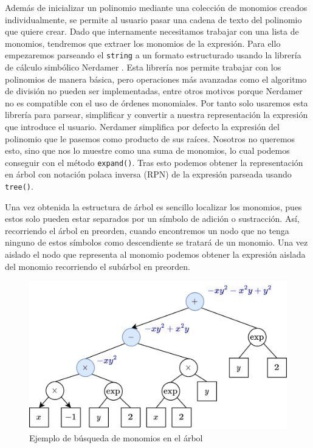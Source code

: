 Además de inicializar un polinomio mediante una colección de monomios creados individualmente, se permite al usuario pasar una cadena de texto del polinomio que quiere crear. Dado que internamente necesitamos trabajar con una lista de monomios, tendremos que extraer los monomios de la expresión. Para ello empezaremos parseando el \texttt{string} a un formato estructurado usando la librería de cálculo simbólico Nerdamer \cite{nerdamer}. Esta librería nos permite trabajar con los polinomios de manera básica, pero operaciones más avanzadas como el algoritmo de división no pueden ser implementadas, entre otros motivos porque Nerdamer no es compatible con el uso de órdenes monomiales. Por tanto solo usaremos esta librería para parsear, simplificar y convertir a nuestra representación la expresión que introduce el usuario. Nerdamer simplifica por defecto la expresión del polinomio que le pasemos como producto de sus raíces. Nosotros no queremos esto, sino que nos lo muestre como una suma de monomios, lo cual podemos conseguir con el método \texttt{expand()}. Tras esto podemos obtener la representación en árbol con notación polaca inversa (RPN) de la expresión parseada usando \texttt{tree()}.\newline

Una vez obtenida la estructura de árbol es sencillo localizar los monomios, pues estos solo pueden estar separados por un símbolo de adición o sustracción. Así, recorriendo el árbol en preorden, cuando encontremos un nodo que no tenga ninguno de estos símbolos como descendiente se tratará de un monomio. Una vez aislado el nodo que representa al monomio podemos obtener la expresión aislada del monomio recorriendo el subárbol en preorden.  
\begin{figure}[ht!]
    \centering
    \includegraphics[width=\textwidth]{Plantilla-TFG-master/img/busquedaMon.png}
    \caption{Ejemplo de búsqueda de monomios en el árbol}
    \label{fig:busquedaMonom}
\end{figure}

